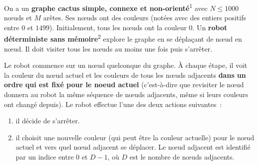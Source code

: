 \documentclass[12pt]{article}
\begin{document}
\renewcommand{\round}{Jour 2}
\renewcommand{\problemName}{Problème Navigation}
\renewcommand{\lang}{Français}

\renewcommand{\tl}{$3$ s}
\renewcommand{\ml}{$512$ Mo}
\problem{\problemName}

On a un \textbf{graphe cactus simple, connexe et non-orienté}\textsuperscript{1} avec $N \leq 1000$ nœuds et $M$ arêtes. Ses nœuds ont des couleurs (notées avec des entiers positifs entre $0$ et $1499$). Initialement, tous les nœuds ont la couleur $0$. Un \textbf{robot déterministe sans mémoire}\textsuperscript{2} explore le graphe en se déplaçant de nœud en nœud. Il doit visiter tous les nœuds au moins une fois puis s'arrêter. 

Le robot commence sur un nœud quelconque du graphe. À chaque étape, il voit la couleur du nœud actuel et les couleurs de tous les nœuds adjacents \textbf{dans un ordre qui est fixé pour le noeud actuel} (c'est-à-dire que revisiter le nœud donnera au robot la même séquence de nœuds adjacents, même si leurs couleurs ont changé depuis). Le robot effectue l'une des deux actions suivantes :
\begin{enumerate}
    \item il décide de s'arrêter.
    \item il choisit une nouvelle couleur (qui peut être la couleur actuelle) pour le nœud actuel et vers quel nœud adjacent se déplacer. Le nœud adjacent est identifié par un indice entre $0$ et $D-1$, où $D$ est le nombre de nœuds adjacents. 
\end{enumerate}
\end{document}
